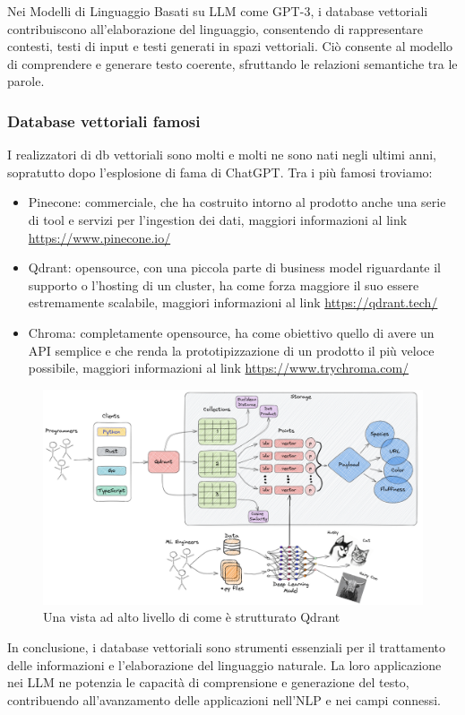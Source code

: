 Nei Modelli di Linguaggio Basati su LLM come GPT-3, i database vettoriali contribuiscono all'elaborazione del linguaggio, consentendo di rappresentare contesti, testi di input e testi generati in spazi vettoriali. Ciò consente al modello di comprendere e generare testo coerente, sfruttando le relazioni semantiche tra le parole.

\subsubsection{Database vettoriali famosi}

I realizzatori di db vettoriali sono molti e molti ne sono nati negli ultimi anni, sopratutto dopo l'esplosione di fama di ChatGPT. Tra i più famosi troviamo:
\begin{itemize}
    \item Pinecone: commerciale, che ha costruito intorno al prodotto anche una serie di tool e servizi per l'ingestion dei dati, maggiori informazioni al link \url{https://www.pinecone.io/}
    \item Qdrant: opensource, con una piccola parte di business model riguardante il supporto o l'hosting di un cluster, ha come forza maggiore il suo essere estremamente scalabile, maggiori informazioni al link \url{https://qdrant.tech/}
    \item Chroma: completamente opensource, ha come obiettivo quello di avere un API semplice e che renda la prototipizzazione di un prodotto il più veloce possibile, maggiori informazioni al link \url{https://www.trychroma.com/}
\end{itemize}

\begin{center}
    \begin{figure}[H]
        \centering
        \includegraphics[width=0.7\pdfpagewidth]{images/qdrant_overview.png}
        \caption{Una vista ad alto livello di come è strutturato Qdrant}
    \end{figure}
\end{center}

In conclusione, i database vettoriali sono strumenti essenziali per il trattamento delle informazioni e l'elaborazione del linguaggio naturale. La loro applicazione nei LLM ne potenzia le capacità di comprensione e generazione del testo, contribuendo all'avanzamento delle applicazioni nell'NLP e nei campi connessi.